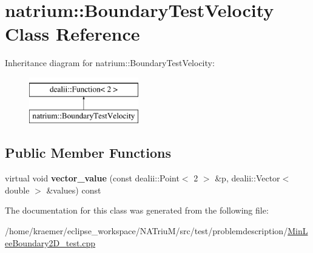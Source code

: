 \hypertarget{classnatrium_1_1BoundaryTestVelocity}{\section{natrium\-:\-:Boundary\-Test\-Velocity Class Reference}
\label{classnatrium_1_1BoundaryTestVelocity}
}
Inheritance diagram for natrium\-:\-:Boundary\-Test\-Velocity\-:\begin{figure}[H]
\begin{center}
\leavevmode
\includegraphics[height=2.000000cm]{classnatrium_1_1BoundaryTestVelocity}
\end{center}
\end{figure}
\subsection*{Public Member Functions}
\begin{DoxyCompactItemize}
\item 
\hypertarget{classnatrium_1_1BoundaryTestVelocity_aabd34d5370328bdbcc5420e9d7c1251f}{virtual void {\bfseries vector\-\_\-value} (const dealii\-::\-Point$<$ 2 $>$ \&p, dealii\-::\-Vector$<$ double $>$ \&values) const }\label{classnatrium_1_1BoundaryTestVelocity_aabd34d5370328bdbcc5420e9d7c1251f}

\end{DoxyCompactItemize}


The documentation for this class was generated from the following file\-:\begin{DoxyCompactItemize}
\item 
/home/kraemer/eclipse\-\_\-workspace/\-N\-A\-Triu\-M/src/test/problemdescription/\hyperlink{MinLeeBoundary2D__test_8cpp}{Min\-Lee\-Boundary2\-D\-\_\-test.\-cpp}\end{DoxyCompactItemize}
